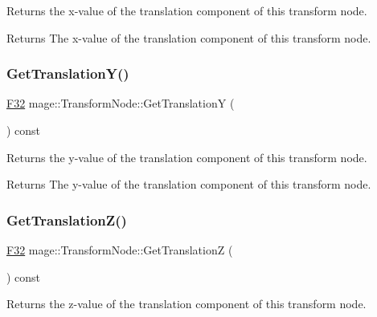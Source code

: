 Returns the x-\/value of the translation component of this transform node.

\begin{DoxyReturn}{Returns}
The x-\/value of the translation component of this transform node. 
\end{DoxyReturn}
\hypertarget{structmage_1_1_transform_node_aedabfc6152a5ad5775cbb10fec790b07}{}\label{structmage_1_1_transform_node_aedabfc6152a5ad5775cbb10fec790b07} 
\subsubsection{\texorpdfstring{Get\+Translation\+Y()}{GetTranslationY()}}
{\footnotesize\ttfamily \hyperlink{namespacemage_aa97e833b45f06d60a0a9c4fc22ae02c0}{F32} mage\+::\+Transform\+Node\+::\+Get\+TranslationY (\begin{DoxyParamCaption}{ }\end{DoxyParamCaption}) const\hspace{0.3cm}{\ttfamily [noexcept]}}

Returns the y-\/value of the translation component of this transform node.

\begin{DoxyReturn}{Returns}
The y-\/value of the translation component of this transform node. 
\end{DoxyReturn}
\hypertarget{structmage_1_1_transform_node_a2c34908570c0d84f9312462a0cc255c7}{}\label{structmage_1_1_transform_node_a2c34908570c0d84f9312462a0cc255c7} 
\subsubsection{\texorpdfstring{Get\+Translation\+Z()}{GetTranslationZ()}}
{\footnotesize\ttfamily \hyperlink{namespacemage_aa97e833b45f06d60a0a9c4fc22ae02c0}{F32} mage\+::\+Transform\+Node\+::\+Get\+TranslationZ (\begin{DoxyParamCaption}{ }\end{DoxyParamCaption}) const\hspace{0.3cm}{\ttfamily [noexcept]}}

Returns the z-\/value of the translation component of this transform node.

